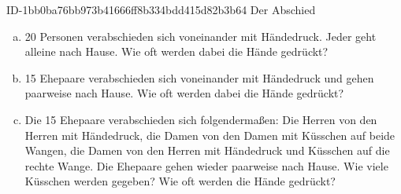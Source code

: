 \begin{exercise}
      {ID-1bb0ba76bb973b41666ff8b334bdd415d82b3b64}
      {Der Abschied}
  \ifproblem\problem\par
    \begin{enumerate}[a)]
      \item 20 Personen verabschieden sich voneinander mit Händedruck. Jeder
            geht alleine nach Hause. Wie oft werden dabei die Hände gedrückt?
      \item 15 Ehepaare verabschieden sich voneinander mit Händedruck und gehen
            paarweise nach Hause. Wie oft werden dabei die Hände gedrückt?
      \item Die 15 Ehepaare verabschieden sich folgendermaßen: Die Herren von
            den Herren mit Händedruck, die Damen von den Damen mit Küsschen auf
            beide Wangen, die Damen von den Herren mit Händedruck und Küsschen
            auf die rechte Wange. Die Ehepaare gehen wieder paarweise nach Hause.
            Wie viele Küsschen werden gegeben? Wie oft werden die Hände gedrückt?
    \end{enumerate}
  \fi
\end{exercise}
